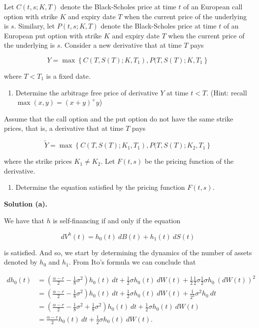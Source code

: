 \documentclass[
]{book}
\providecommand{\tightlist}{%
  \setlength{\itemsep}{0pt}\setlength{\parskip}{0pt}}
\begin{document}
Let \(C(t,s;K,T)\) denote the Black-Scholes price at time \(t\) of an European call option with strike \(K\) and expiry date \(T\) when the current price of the underlying is \(s\). Similary, let \(P(t,s;K,T)\) denote the Black-Scholes price at time \(t\) of an European put option with strike \(K\) and expiry date \(T\) when the current price of the underlying is \(s\). Consider a new derivative that at time \(T\) pays

\[
Y=\max\left\{C(T,S(T);K,T_1),P(T,S(T);K,T_1\right\}
\]

where \(T<T_1\) is a fixed date.

\begin{enumerate}
\def\labelenumi{\alph{enumi}.}
\setcounter{enumi}{2}
\tightlist
\item
  Determine the arbitrage free price of derivative \(Y\) at time \(t<T\). (Hint: recall \(\max(x,y)=(x+y)^+y\))
\end{enumerate}

Assume that the call option and the put option do not have the same strike prices, that is, a derivative that at time \(T\) pays

\[
\widetilde{Y}=\max\left\{C(T,S(T);K_1,T_1),P(T,S(T);K_2,T_1\right\}
\]

where the strike prices \(K_1\ne K_2\). Let \(F(t,s)\) be the pricing function of the derivative.

\begin{enumerate}
\def\labelenumi{\alph{enumi}.}
\setcounter{enumi}{3}
\tightlist
\item
  Determine the equation satisfied by the pricing function \(F(t,s)\).
\end{enumerate}

\noindent\makebox[\linewidth]{\rule{\textwidth}{0.4pt}}

\textbf{Solution (a).}

We have that \(h\) is self-financing if and only if the equation

\[
dV^h(t)=h_0(t)\ dB(t)+h_1(t)\ dS(t)
\]

is satisfied. And so, we start by determining the dynamics of the number of assets denoted by \(h_0\) and \(h_1\). From Ito's formula we can conclude that

\begin{align*}
dh_0(t)&=\left(\frac{\alpha - r}{2}-\frac{1}{8}\sigma^2\right)h_0(t)\ dt+\frac{1}{2}\sigma h_0(t)\ dW(t)+\frac{1}{2} \frac{1}{2}\sigma \frac{1}{2}\sigma h_0 \ (d W(t))^2\\
&=\left(\frac{\alpha - r}{2}-\frac{1}{8}\sigma^2\right)h_0(t)\ dt+\frac{1}{2}\sigma h_0(t)\ dW(t)+ \frac{1}{2^3}\sigma^2 h_0 \ dt\\
&=\left(\frac{\alpha - r}{2}-\frac{1}{8}\sigma^2+ \frac{1}{8}\sigma^2 \right)h_0(t)\ dt+\frac{1}{2}\sigma h_0(t)\ dW(t)\\
&=\frac{\alpha - r}{2}h_0(t)\ dt+\frac{1}{2}\sigma h_0(t)\ dW(t).
\end{align*}
\end{document}
